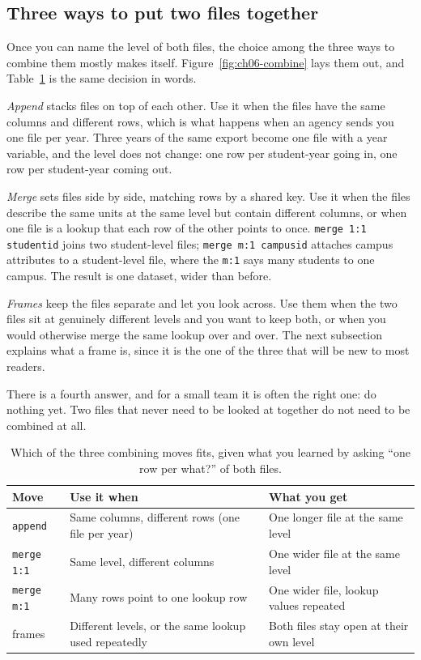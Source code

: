 \subsection{Three ways to put two files together}\label{sec:ch06-threeways}
Once you can name the level of both files, the choice among the three ways to combine them mostly makes itself. Figure~\ref{fig:ch06-combine} lays them out, and Table~\ref{tab:ch06-combine} is the same decision in words.

\emph{Append} stacks files on top of each other. Use it when the files have the same columns and different rows, which is what happens when an agency sends you one file per year. Three years of the same export become one file with a year variable, and the level does not change: one row per student-year going in, one row per student-year coming out.

\emph{Merge} sets files side by side, matching rows by a shared key. Use it when the files describe the same units at the same level but contain different columns, or when one file is a lookup that each row of the other points to once. \texttt{merge 1:1 studentid} joins two student-level files; \texttt{merge m:1 campusid} attaches campus attributes to a student-level file, where the \texttt{m:1} says many students to one campus. The result is one dataset, wider than before.

\emph{Frames} keep the files separate and let you look across. Use them when the two files sit at genuinely different levels and you want to keep both, or when you would otherwise merge the same lookup over and over. The next subsection explains what a frame is, since it is the one of the three that will be new to most readers.

There is a fourth answer, and for a small team it is often the right one: do nothing yet. Two files that never need to be looked at together do not need to be combined at all.

\begin{table}[htbp]
\centering
\footnotesize
\caption[Append, merge, or frames]{Which of the three combining moves fits, given what you learned by asking \enquote{one row per what?} of both files.}
\label{tab:ch06-combine}
\begin{tabular}{@{}p{2.6cm}p{5.4cm}p{6.6cm}@{}}
\hline
Move & Use it when & What you get \\
\hline
\texttt{append} & Same columns, different rows (one file per year) & One longer file at the same level \\
\texttt{merge 1:1} & Same level, different columns & One wider file at the same level \\
\texttt{merge m:1} & Many rows point to one lookup row & One wider file, lookup values repeated \\
frames & Different levels, or the same lookup used repeatedly & Both files stay open at their own level \\
\hline
\end{tabular}
\end{table}

